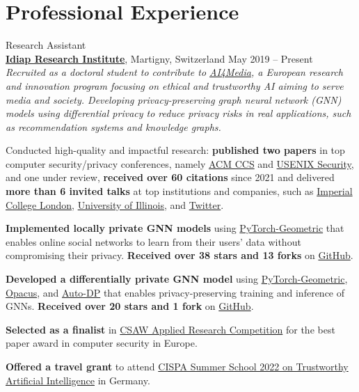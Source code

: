 \documentclass[11pt]{article}
\begin{document}
\section{Professional Experience}

\begin{outerlist}

	\item {Research Assistant}\\
	\textbf{\href{https://idiap.ch}{Idiap Research Institute}}, Martigny, Switzerland \hfill {May 2019 -- Present}\\
  \textit{Recruited as a doctoral student to contribute to \href{https://www.ai4media.eu/}{AI4Media}, a European research and innovation program focusing on ethical and trustworthy AI aiming to serve media and society. Developing privacy-preserving graph neural network (GNN) models using differential privacy to reduce privacy risks in real applications, such as recommendation systems and knowledge graphs.}
	\begin{innerlist}
		\item Conducted high-quality and impactful research: \textbf{published two papers} in top computer security/privacy conferences, namely \href{https://www.sigsac.org/ccs/CCS2021/}{ACM CCS} and \href{https://www.usenix.org/conference/usenixsecurity23/}{USENIX Security}, and one under review, \textbf{received over 60 citations} since 2021 and delivered \textbf{more than 6 invited talks} at top institutions and companies, such as \href{https://ix.imperial.ac.uk/}{Imperial College London}, \href{https://cs.uic.edu/}{University of Illinois}, and \href{https://twitter.com/}{Twitter}.
		\item \textbf{Implemented locally private GNN models} using \href{https://www.pyg.org/}{PyTorch-Geometric} that enables online social networks to learn from their users' data without compromising their privacy. \textbf{Received over 38 stars and 13 forks} on \href{https://github.com/sisaman/LPGNN}{GitHub}.
		\item \textbf{Developed a differentially private GNN model} using \href{https://www.pyg.org/}{PyTorch-Geometric}, \href{https://opacus.ai/}{Opacus}, and \href{https://github.com/yuxiangw/autodp}{Auto-DP} that enables privacy-preserving training and inference of GNNs. \textbf{Received over 20 stars and 1 fork} on \href{https://github.com/sisaman/GAP}{GitHub}.
		\item \textbf{Selected as a finalist} in \href{https://www.csaw.io/research}{CSAW Applied Research Competition} for the best paper award in computer security in Europe.
		\item \textbf{Offered a travel grant} to attend \href{https://cispa.de/en/summer-school-2022}{CISPA Summer School 2022 on Trustworthy Artificial Intelligence} in Germany.
	\end{innerlist}


\end{outerlist}
\end{document}
